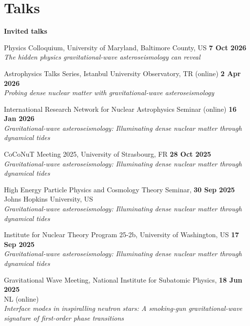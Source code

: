 \section{Talks}

\textbf{Invited talks}
%
\vspace*{0.05in}
\begin{etaremune}
    \item Physics Colloquium, University of Maryland, Baltimore County, US
    \hfill \textbf{7 Oct 2026} \\
    \textit{The hidden physics gravitational-wave asteroseismology can reveal}
    \item Astrophysics Talks Series, Istanbul University Observatory, TR (online)
    \hfill \textbf{2 Apr 2026} \\
    \textit{Probing dense nuclear matter with gravitational-wave asteroseismology}
    \item International Research Network for Nuclear Astrophysics Seminar (online)
    \hfill \textbf{16 Jan 2026} \\
    \textit{Gravitational-wave asteroseismology: Illuminating dense nuclear matter through dynamical tides}
    \item CoCoNuT Meeting 2025, University of Strasbourg, FR
    \hfill \textbf{28 Oct 2025} \\
    \textit{Gravitational-wave asteroseismology: Illuminating dense nuclear matter through dynamical tides}
    \item High Energy Particle Physics and Cosmology Theory Seminar,
    \hfill \textbf{30 Sep 2025} \\
    Johns Hopkins University, US \\
    \textit{Gravitational-wave asteroseismology: Illuminating dense nuclear matter through dynamical tides}
    \item Institute for Nuclear Theory Program 25-2b, University of Washington, US
    \hfill \textbf{17 Sep 2025} \\
    \textit{Gravitational-wave asteroseismology: Illuminating dense nuclear matter through dynamical tides}
    \item Gravitational Wave Meeting, National Institute for Subatomic Physics,
    \hfill \textbf{18 Jun 2025} \\
    NL (online) \\
    \textit{Interface modes in inspiralling neutron stars: A smoking-gun gravitational-wave signature of first-order phase transitions}

\end{etaremune}
